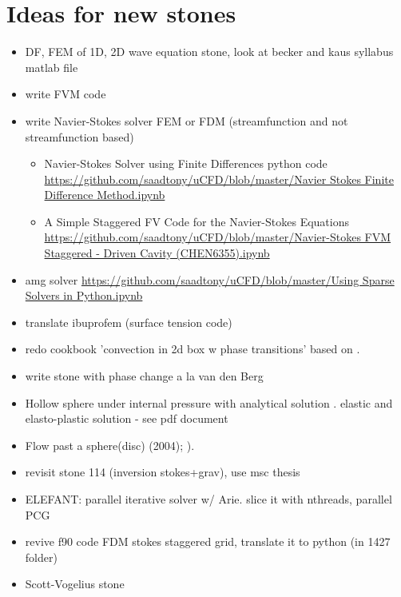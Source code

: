 \documentclass[a4paper]{article}
\begin{document}
\newpage
\section{Ideas for new stones}

\begin{itemize}
\item DF, FEM of 1D, 2D wave equation stone, look at becker and kaus syllabus matlab file
\item write FVM code
\item write Navier-Stokes solver FEM or FDM (streamfunction and not streamfunction based)\\
\begin{itemize}
\item Navier-Stokes Solver using Finite Differences python code 
\url{https://github.com/saadtony/uCFD/blob/master/Navier Stokes Finite Difference Method.ipynb}
\item A Simple Staggered FV Code for the Navier-Stokes Equations
\url{https://github.com/saadtony/uCFD/blob/master/Navier-Stokes FVM Staggered - Driven Cavity (CHEN6355).ipynb}
\end{itemize}
\item amg solver
\url{https://github.com/saadtony/uCFD/blob/master/Using Sparse Solvers in Python.ipynb}

\item translate ibuprofem (surface tension code)
\item redo  cookbook 'convection in 2d box w phase transitions' based on \textcite{chyu85}. 
\item write stone with phase change a la van den Berg \textcite{vava08}
\item Hollow sphere under internal pressure with analytical solution
. elastic and elasto-plastic solution  - see pdf document
\item Flow past a sphere(disc) \textcite{demj04} (2004); 
      \textcite{gafp17}). 
\item revisit stone 114 (inversion stokes+grav), use msc thesis 
\item ELEFANT:  parallel iterative solver w/ Arie. slice it with nthreads, parallel PCG
\item revive f90 code FDM stokes staggered grid, translate it to python 
(in 1427 folder)
\item Scott-Vogelius stone
\end{itemize}
\end{document}
